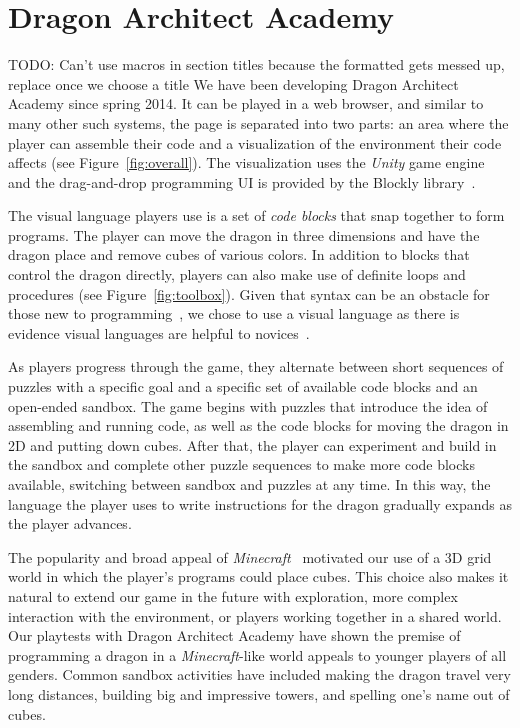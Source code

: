 \documentclass{sig-alternate}
\newcommand{\TODO}[1]{{\color{red} TODO: #1}}
\newcommand{\gametitle}{{\color{RoyalPurple} Dragon Architect Academy}}
\begin{document}
\section{\gametitle{}}
\TODO{Can't use macros in section titles because the formatted gets messed up, replace once we choose a title} 
We have been developing \gametitle{} since spring 2014. 
It can be played in a web browser, and similar to many other such systems, the page is separated into two parts: an area where the player can assemble their code and a visualization of the environment their code affects (see Figure~\ref{fig:overall}). 
The visualization uses the \emph{Unity} game engine~\cite{unity} and the drag-and-drop programming UI is provided by the Blockly library~\cite{blockly}.

The visual language players use is a set of \emph{code blocks} that snap together to form programs. 
The player can move the dragon in three dimensions and have the dragon place and remove cubes of various colors. 
In addition to blocks that control the dragon directly, players can also make use of definite loops and procedures (see Figure~\ref{fig:toolbox}).
Given that syntax can be an obstacle for those new to programming~\cite{stefik2013syntax}, we chose to use a visual language as there is evidence visual languages are helpful to novices~\cite{whitley1997visual}.

As players progress through the game, they alternate between short sequences of puzzles with a specific goal and a specific set of available code blocks and an open-ended sandbox. 
The game begins with puzzles that introduce the idea of assembling and running code, as well as the code blocks for moving the dragon in 2D and putting down cubes.
After that, the player can experiment and build in the sandbox and complete other puzzle sequences to make more code blocks available, switching between sandbox and puzzles at any time. 
In this way, the language the player uses to write instructions for the dragon gradually expands as the player advances.

The popularity and broad appeal of \emph{Minecraft}~\cite{minecraft} motivated our use of a 3D grid world in which the player's programs could place cubes.
This choice also makes it natural to extend our game in the future with exploration, more complex interaction with the environment, or players working together in a shared world.
Our playtests with \gametitle{} have shown the premise of programming a dragon in a \emph{Minecraft}-like world appeals to younger players of all genders.
Common sandbox activities have included making the dragon travel very long distances, building big and impressive towers, and spelling one's name out of cubes.
\end{document}
